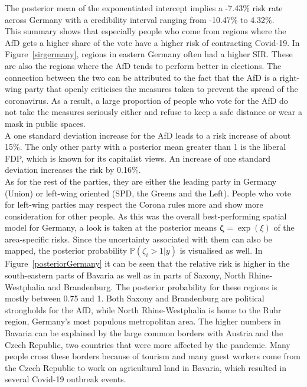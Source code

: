 The posterior mean of the exponentiated intercept implies a -7.43\% risk rate across Germany with a credibility interval ranging from -10.47\% to 4.32\%.  \\
This summary shows that especially people who come from regions where the AfD gets a higher share of the vote have a higher risk of contracting Covid-19. In Figure~\ref{sirgermany}, regions in eastern Germany often had a higher SIR. These are also the regions where the AfD tends to perform better in elections. The connection between the two can be attributed to the fact that the AfD is a right-wing party that openly criticises the measures taken to prevent the spread of the coronavirus. As a result, a large proportion of people who vote for the AfD do not take the measures seriously either and refuse to keep a safe distance or wear a mask in public spaces. \\
A one standard deviation increase for the AfD leads to a risk increase of about 15\%. The only other party with a posterior mean greater than 1 is the liberal FDP, which is known for its capitalist views. An increase of one standard deviation increases the risk by 0.16\%. \\
As for the rest of the parties, they are either the leading party in Germany (Union) or left-wing oriented (SPD, the Greens and the Left). People who vote for left-wing parties may respect the Corona rules more and show more consideration for other people.
As this was the overall best-performing spatial model for Germany, a look is taken at the posterior means $\pmb{\zeta} = \exp{\left(\xi\right)}$ of the area-specific risks. Since the uncertainty associated with them can also be mapped, the posterior probability $\mathbb{P}\left(\zeta_i > 1|y\right)$ is visualised as well. In Figure~\ref{posteriorGermany} it can be seen that the relative risk is higher in the south-eastern parts of Bavaria as well as in parts of Saxony, North Rhine-Westphalia and Brandenburg. The posterior probability for these regions is mostly between 0.75 and 1. Both Saxony and Brandenburg are political strongholds for the AfD, while North Rhine-Westphalia is home to the Ruhr region, Germany's most populous metropolitan area. The higher numbers in Bavaria can be explained by the large common borders with Austria and the Czech Republic, two countries that were more affected by the pandemic. Many people cross these borders because of tourism and many guest workers come from the Czech Republic to work on agricultural land in Bavaria, which resulted in several Covid-19 outbreak events.
